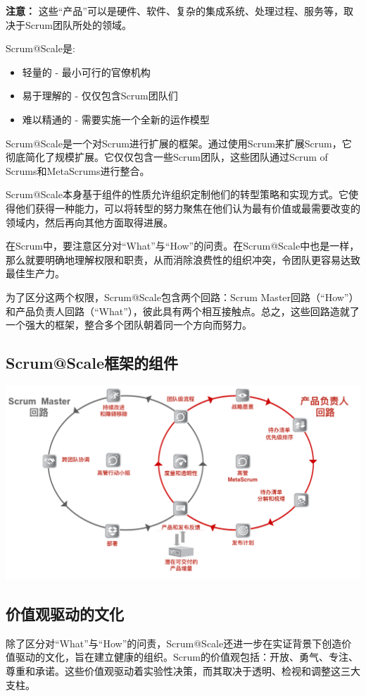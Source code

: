 \documentclass[12pt,a4paper,parskip=full]{scrartcl}
\begin{document}
\begin{CJK*}{UTF8}{gbsn}
\textbf{注意：} 这些“产品”可以是硬件、软件、复杂的集成系统、处理过程、服务等，取决于Scrum团队所处的领域。

Scrum@Scale是:
\begin{itemize}
\item 轻量的 - 最小可行的官僚机构
\item 易于理解的 - 仅仅包含Scrum团队们
\item 难以精通的 - 需要实施一个全新的运作模型
\end{itemize}

Scrum@Scale是一个对Scrum进行扩展的框架。通过使用Scrum来扩展Scrum，它彻底简化了规模扩展。它仅仅包含一些Scrum团队，这些团队通过Scrum of Scrums和MetaScrums进行整合。

Scrum@Scale本身基于组件的性质允许组织定制他们的转型策略和实现方式。它使得他们获得一种能力，可以将转型的努力聚焦在他们认为最有价值或最需要改变的领域内，然后再向其他方面取得进展。

在Scrum中，要注意区分对“What”与“How”的问责。在Scrum@Scale中也是一样，那么就要明确地理解权限和职责，从而消除浪费性的组织冲突，令团队更容易达致最佳生产力。

为了区分这两个权限，Scrum@Scale包含两个回路：Scrum Master回路（“How”）和产品负责人回路（“What”），彼此具有两个相互接触点。总之，这些回路造就了一个强大的框架，整合多个团队朝着同一个方向而努力。

\subsection{Scrum@Scale框架的组件}

\includegraphics[width=1.0\linewidth]{SMPO-Cycle.png}

\subsection{价值观驱动的文化}
除了区分对“What”与“How”的问责，Scrum@Scale还进一步在实证背景下创造价值驱动的文化，旨在建立健康的组织。Scrum的价值观包括：开放、勇气、专注、尊重和承诺。这些价值观驱动着实验性决策，而其取决于透明、检视和调整这三大支柱。


\end{CJK*}
\end{document}
